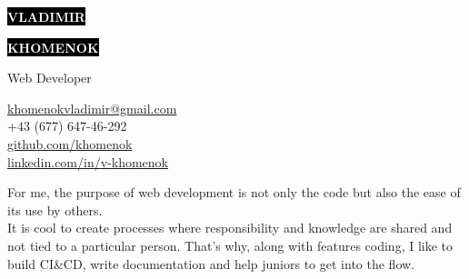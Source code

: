\documentclass[10pt]{template}
\makeatletter
\newcommand{\cvVarPhone}{+43 (677) 647-46-292}
\newcommand{\cvVarEmail}{khomenokvladimir@gmail.com}
\newcommand{\cvVarGitHub}{khomenok}
\newcommand{\cvVarLinkedIn}{v-khomenok}
\makeatother
\begin{document}
\begin{minipage}[t]{0.55\textwidth}
	\vspace{-\baselineskip}
		
	\colorbox{black}{{\HUGE\textcolor{white}{\textbf{\MakeUppercase{Vladimir}}}}}
		
	\colorbox{black}{{\HUGE\textcolor{white}{\textbf{\MakeUppercase{Khomenok}}}}}
		
	\vspace{6pt}
		
	{\huge Web Developer}
\end{minipage}
\begin{minipage}[t]{0.325\textwidth}
		
	\vspace{-\baselineskip}	
	\href{mailto:\cvVarEmail}{\cvVarEmail}\\
	\cvVarPhone\\
		
	\href{https://github.com/khomenok}{{\color{gray}github.com/}\cvVarGitHub}\\
	\href{https://linkedin.com/in/v-khomenok}{{\color{gray}linkedin.com/in/}\cvVarLinkedIn}
\end{minipage}

\vspace{1cm}

For me, the purpose of web development is not only the code but also the ease of its use by others.\\
It is cool to create processes where responsibility and knowledge are shared and not tied to a particular person. That's why, along with features coding, I like to build CI\&CD, write documentation and help juniors to get into the flow. \\


\end{document}
